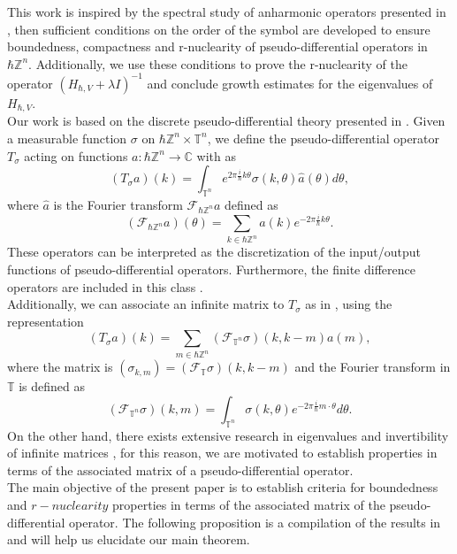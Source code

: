 \documentclass[pdflatex,sn-mathphys-num]{sn-jnl}%
\theoremstyle{thmstyleone}%
\theoremstyle{thmstyletwo}%
\theoremstyle{thmstylethree}%
\begin{document}
\indent This work is inspired by the spectral study of anharmonic operators presented in \cite{chatzakou2021class}, then sufficient conditions on the order of the symbol are developed to ensure boundedness, compactness and r-nuclearity of pseudo-differential operators in $\hbar\mathbb{Z}^n$. Additionally, we use these conditions to prove the r-nuclearity of the operator $(H_{\hbar,V}+\lambda I)^{-1}$ and conclude growth estimates for the eigenvalues of $H_{\hbar,V}$.\\
\indent Our work is based on the discrete pseudo-differential theory presented in \cite{molahajloo2010pseudo,botchway2020difference,botchway2024semi}.  Given a measurable function $\sigma$ on $\hbar\mathbb{Z}^n\times\mathbb{T}^n$, we define the pseudo-differential operator $T_\sigma$ acting on functions $a:\hbar\mathbb{Z}^n\to \mathbb{C}$ with as
\[(T_\sigma a )(k)=\int_{\mathbb{T}^n} e^{2\pi\frac{i}{\hbar}k\theta}\sigma (k,\theta) \hat{a}(\theta)d\theta, \]
where $\hat{a}$ is the Fourier transform $\mathcal{F}_{\hbar\mathbb{Z}^n}a$ defined as
\[(\mathcal{F}_{\hbar\mathbb{Z}^n}a)(\theta)=\sum_{k\in\hbar\mathbb{Z}^n} a(k)e^{-2\pi\frac{i}{\hbar}k\theta}. \]
\noindent These operators can be interpreted as the discretization of the input/output functions of pseudo-differential operators. Furthermore, the finite difference operators are included in this class \cite{botchway2020difference}.\\
\indent Additionally, we can associate an infinite matrix to 
$T_\sigma$ as in \cite{botchway2024semi}, using the representation
\begin{equation}\label{matrix operator}
(T_\sigma a )(k)=\sum_{m\in\hbar\mathbb{Z}^n} (\mathcal{F}_{\mathbb{T}^n} \sigma)(k,k-m)a(m),
\end{equation}
where the matrix is $(\sigma_{k,m})=(\mathcal{F}_{\mathbb{T}} \sigma)(k,k-m)$ and the Fourier transform in $\mathbb{T}$ is defined as
\begin{equation}\label{Fourier sigma}
(\mathcal{F}_{\mathbb{T}^n}\sigma)(k,m)=\int_{\mathbb{T}^n} \sigma(k,\theta)e^{-2\pi\frac{i}{\hbar}m\cdot \theta}d\theta.
\end{equation}
\noindent On the other hand, there exists extensive research in eigenvalues and invertibility of infinite matrices \cite{shivakumar1987eigenvalues,shivakumar2009review,koehler1957estimates,boffi2010finite}, for this reason, we are motivated to establish properties in terms of the associated matrix of a pseudo-differential operator.\\
\indent The main objective of the present paper is to establish criteria for boundedness and $r-nuclearity$ properties in terms of the associated matrix of the pseudo-differential operator. The following proposition is a compilation of the results in \cite{molahajloo2010pseudo,delgado2013p} and will help us elucidate our main theorem.
\end{document}
